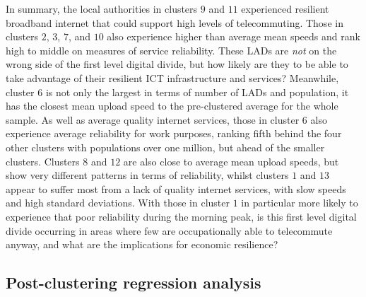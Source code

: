\documentclass[,]{sagej}
\begin{document}
In summary, the local authorities in clusters \(9\) and \(11\)
experienced resilient broadband internet that could support high levels
of telecommuting. Those in clusters \(2\), \(3\), \(7\), and \(10\) also
experience higher than average mean speeds and rank high to middle on
measures of service reliability. These LADs are \emph{not} on the wrong
side of the first level digital divide, but how likely are they to be
able to take advantage of their resilient ICT infrastructure and
services? Meanwhile, cluster \(6\) is not only the largest in terms of
number of LADs and population, it has the closest mean upload speed to
the pre-clustered average for the whole sample. As well as average
quality internet services, those in cluster \(6\) also experience
average reliability for work purposes, ranking fifth behind the four
other clusters with populations over one million, but ahead of the
smaller clusters. Clusters \(8\) and \(12\) are also close to average
mean upload speeds, but show very different patterns in terms of
reliability, whilst clusters \(1\) and \(13\) appear to suffer most from
a lack of quality internet services, with slow speeds and high standard
deviations. With those in cluster \(1\) in particular more likely to
experience that poor reliability during the morning peak, is this first
level digital divide occurring in areas where few are occupationally
able to telecommute anyway, and what are the implications for economic
resilience?

\hypertarget{sec:4.2}{%
\subsection{Post-clustering regression analysis}\label{sec:4.2}}
\end{document}

